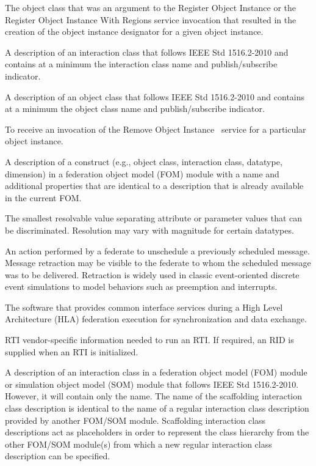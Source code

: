 \clearpage
{} The object class that was an argument to the Register Object Instance or the Register Object Instance With Regions service invocation that resulted in the creation of the object instance designator for a given object instance.

 A description of an interaction class that follows IEEE Std 1516.2-2010 and contains at a minimum the interaction class name and publish/subscribe indicator.

 A description of an object class that follows IEEE Std 1516.2-2010 and contains at a minimum the object class name and publish/subscribe indicator.

 To receive an invocation of the Remove Object Instance \rtiinitiated\ service for a particular object instance.

 A description of a construct (e.g., object class, interaction class, datatype, dimension) in a federation object model (FOM) module with a name and additional properties that are identical to a description that is already available in the current FOM.

 The smallest resolvable value separating attribute or parameter values that can be discriminated. Resolution may vary with magnitude for certain datatypes.

 An action performed by a federate to unschedule a previously scheduled message. Message retraction may be visible to the federate to whom the scheduled message was to be delivered. Retraction is widely used in classic event-oriented discrete event simulations to model behaviors such as preemption and interrupts.

 The software that provides common interface services during a High Level Architecture (HLA) federation execution for synchronization and data exchange.

 RTI vendor-specific information needed to run an RTI. If required, an RID is supplied when an RTI is initialized.

 A description of an interaction class in a federation object model (FOM) module or simulation object model (SOM) module that follows IEEE Std 1516.2-2010. However, it will contain only the name. The name of the scaffolding interaction class description is identical to the name of a regular interaction class description provided by another FOM/SOM module. Scaffolding interaction class descriptions act as placeholders in order to represent the class hierarchy from the other FOM/SOM module(s) from which a new regular interaction class description can be specified.

